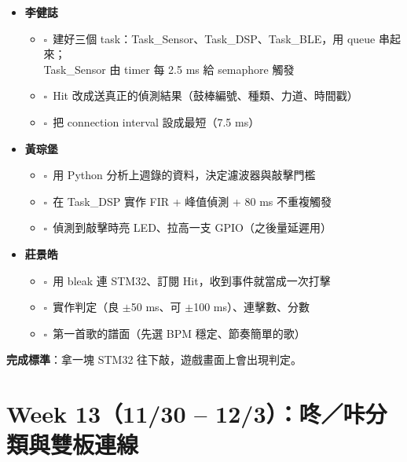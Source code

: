 \documentclass[11pt]{article}
\newcommand{\todo}{$\square$\ }
\newcommand{\who}[1]{\textbf{#1}}
\begin{document}
\begin{itemize}[label={}]
  \item \who{李健誌}
  \begin{itemize}[label={}]
    \item \todo 建好三個 task：Task\_Sensor、Task\_DSP、Task\_BLE，用 queue 串起來；\\
    Task\_Sensor 由 timer 每 2.5 ms 給 semaphore 觸發
    \item \todo Hit 改成送真正的偵測結果（鼓棒編號、種類、力道、時間戳）
    \item \todo 把 connection interval 設成最短（7.5 ms）
  \end{itemize}
  \item \who{黃琮堡}
  \begin{itemize}[label={}]
    \item \todo 用 Python 分析上週錄的資料，決定濾波器與敲擊門檻
    \item \todo 在 Task\_DSP 實作 FIR + 峰值偵測 + 80 ms 不重複觸發
    \item \todo 偵測到敲擊時亮 LED、拉高一支 GPIO（之後量延遲用）
  \end{itemize}
  \item \who{莊景皓}
  \begin{itemize}[label={}]
    \item \todo 用 bleak 連 STM32、訂閱 Hit，收到事件就當成一次打擊
    \item \todo 實作判定（良 $\pm$50 ms、可 $\pm$100 ms）、連擊數、分數
    \item \todo 第一首歌的譜面（先選 BPM 穩定、節奏簡單的歌）
  \end{itemize}
\end{itemize}
\textbf{完成標準}：拿一塊 STM32 往下敲，遊戲畫面上會出現判定。

\section*{Week 13（11/30 -- 12/3）：咚／咔分類與雙板連線}
\end{document}
